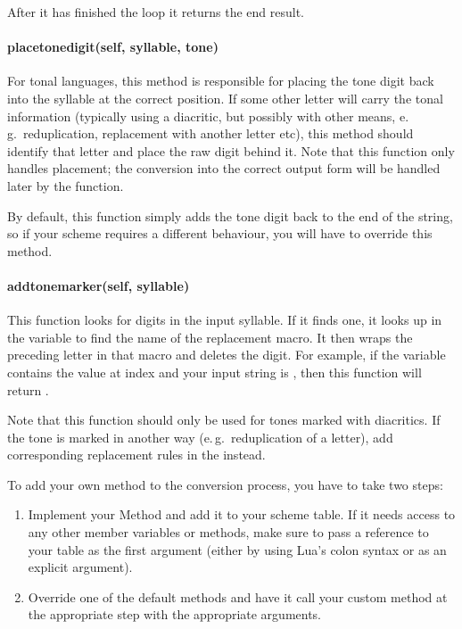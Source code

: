 \documentclass{ltxdockit}
\begin{document}
After it has finished the loop it returns the end result.

\paragraph{place\textunderscore{}tone\textunderscore{}digit(self, syllable,
tone)}

For tonal languages, this method is responsible for placing the tone digit back
into the syllable at the correct position. If some other letter will carry the
tonal information (typically using a diacritic, but possibly with other means,
e.\,g.\ reduplication, replacement with another letter etc), this method should
identify that letter and place the raw digit behind it. Note that this function
only handles placement; the conversion into the correct output form will be
handled later by the 
function.

By default, this function simply adds the tone digit back to the end of the
string, so if your scheme requires a different behaviour, you will have to
override this method.

\paragraph{add\textunderscore{}tone\textunderscore{}marker(self, syllable)}

This function looks for digits in the input syllable. If it finds one, it looks
up in the  variable to find the name of the
replacement macro. It then wraps the preceding letter in that macro and deletes
the digit. For example, if the  variable
contains the value  at index  and your input string is
, then this function will return .

Note that this function should only be used for tones marked with diacritics. If
the tone is marked in another way (e.\,g.\ reduplication of a letter), add
corresponding replacement rules in the
 instead.


To add your own method to the conversion process, you have to take two steps:

\begin{enumerate}
  \item Implement your Method and add it to your scheme table. If it needs
    access to any other member variables or methods, make sure to pass a
    reference to your table as the first argument (either by using Lua's colon
    syntax or as an explicit argument).
  \item Override one of the default methods and have it call your custom method
    at the appropriate step with the appropriate arguments.
\end{enumerate}
\end{document}
